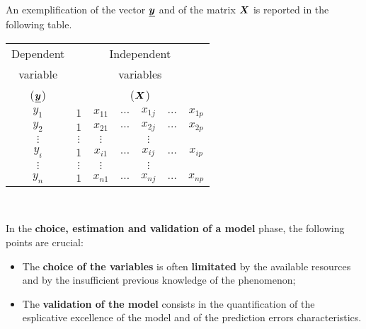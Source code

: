 \begin{frame}
  \vspace*{.25cm}
  An exemplification of the vector $ \boldsymbol{\underline{y}} $ and of the matrix $ \boldsymbol{X} $ is reported in the following table.
  \vspace*{.5cm}
  \begin{center}
    \begin{tabular}{|c||c|c|c|c|c|c|}
      \hline
      Dependent & \multicolumn{6}{|c|}{Independent} \\
      variable & \multicolumn{6}{|c|}{variables} \\
      ($ \boldsymbol{\underline{y}} $) & \multicolumn{6}{|c|}{($ \boldsymbol{X} $)} \\
      \hline
      \hline
      $y_1$ & $1$ & \hspace*{.25cm}$x_{11}$\hspace*{.25cm} & \hspace*{.25cm}$\dots$\hspace*{.25cm} & \hspace*{.25cm}$x_{1j}$\hspace*{.25cm} & \hspace*{.25cm}$\dots$\hspace*{.25cm} & \hspace*{.25cm}$x_{1p}$\hspace*{.25cm} \\
      \hline
      $y_2$ & $1$ & $x_{21}$ & $\dots$ & $x_{2j}$ & $\dots$ & $x_{2p}$ \\
      \hline
      $\vdots$ & $\vdots$ & $\vdots$ &  & $\vdots$ &  &  \\
      \hline
      $y_i$ & $1$ & $x_{i1}$ & $\dots$ & $x_{ij}$ & $\dots$ & $x_{ip}$ \\
      \hline
      $\vdots$ & $\vdots$ & $\vdots$ &  & $\vdots$ &  &  \\
      \hline
      $y_n$ & $1$ & $x_{n1}$ & $\dots$ & $x_{nj}$ & $\dots$ & $x_{np}$ \\
      \hline
    \end{tabular}\\
  \end{center}
\end{frame}

\begin{frame}
  \vspace*{.5cm}
  In the \textbf{choice, estimation and validation of a model} phase, the following points are crucial:
  \vspace*{.5cm}
  \begin{itemize}
    \item The \textbf{choice of the variables} is often \textbf{limitated} by the available resources and by the insufficient previous knowledge of the phenomenon;
    \vspace*{.5cm}
    \item The \textbf{validation of the model} consists in the quantification of the esplicative excellence of the model and of the prediction errors characteristics.
  \end{itemize}
\end{frame}


